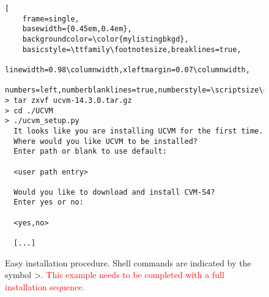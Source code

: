 
\begin{figure}[ht!]
\begin{lstlisting}[
	frame=single,
	basewidth={0.45em,0.4em},
	backgroundcolor=\color{mylistingbkgd},
	basicstyle=\ttfamily\footnotesize,breaklines=true,
	linewidth=0.98\columnwidth,xleftmargin=0.07\columnwidth,
	numbers=left,numberblanklines=true,numberstyle=\scriptsize\color{mylistingnclr}]
> tar zxvf ucvm-14.3.0.tar.gz
> cd ./UCVM
> ./ucvm_setup.py
  It looks like you are installing UCVM for the first time.
  Where would you like UCVM to be installed?
  Enter path or blank to use default: 

  <user path entry>

  Would you like to download and install CVM-S4?
  Enter yes or no: 

  <yes,no>

  [...]
\end{lstlisting}
\caption{Easy installation procedure. Shell commands are indicated by the symbol \textgreater. \textcolor{red}{This example needs to be completed with a full installation sequence.}}
\label{fig:instaeasy}
\end{figure}